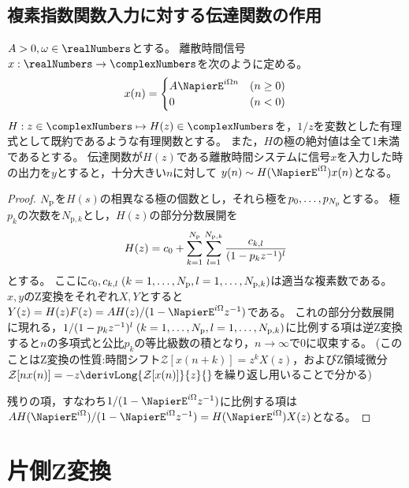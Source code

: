         \section{複素指数関数入力に対する伝達関数の作用}
            \begin{shadebox}
                $A>0,\omega \in \realNumbers$とする。
                離散時間信号$x: \realNumbers \to \complexNumbers$を次のように定める。
                \[
                    x(n) =
                    \begin{cases}
                        A\NapierE^{i\Omega n} & (n\geq 0) \\
                        0 & (n<0)
                    \end{cases}
                \]
                $H: z\in\complexNumbers \mapsto H(z) \in \complexNumbers$を，$1/z$を変数とした有理式として既約であるような有理関数とする。
                また，$H$の極の絶対値は全て1未満であるとする。
                伝達関数が$H(z)$である離散時間システムに信号$x$を入力した時の出力を$y$とすると，十分大きい$n$に対して
                $y(n) \sim H(\NapierE^{i\Omega})x(n)$となる。
            \end{shadebox}
            \begin{proof}
                ${N_\mathrm{p}}$を$H(s)$の相異なる極の個数とし，それら極を$p_0,\dots,p_{{N_\mathrm{p}}}$とする。
                極$p_k$の次数を$N_{\mathrm{p},k}$とし，$H(z)$の部分分数展開を
                \[ H(z) = c_0 + \sum_{k=1}^{{N_\mathrm{p}}} \sum_{l=1}^{N_{\mathrm{p},k}} \frac{c_{k,l}}{(1-p_kz^{-1})^l} \]
                とする。
                ここに$c_0,c_{k,l}\;(k=1,\dots,{N_\mathrm{p}},l=1,\dots,N_{\mathrm{p},k})$は適当な複素数である。
                $x,y$のZ変換をそれぞれ$X,Y$とすると$Y(z) = H(z)F(z) = A H(z)/(1-\NapierE^{i\Omega}z^{-1})$である。
                これの部分分数展開に現れる，$1/(1-p_k z^{-1})^l\;(k=1,\dots,{N_\mathrm{p}},l=1,\dots,N_{\mathrm{p},k})$に比例する項は逆Z変換すると$n$の多項式と公比$p_k$の等比級数の積となり，$n\to\infty$で0に収束する。
                (このことはZ変換の性質:時間シフト$\mathcal{Z}[x(n+k)] = z^kX(z)$，およびZ領域微分$\mathcal{Z}[nx(n)] = -z\derivLong{\mathcal{Z}[x(n)]}{z}{}$を繰り返し用いることで分かる)
                \par
                残りの項，すなわち$1/(1-\NapierE^{i\Omega}z^{-1})$に比例する項は$AH(\NapierE^{i\Omega})/(1-\NapierE^{i\Omega}z^{-1}) = H(\NapierE^{i\Omega})X(z)$となる。
            \end{proof}
    \chapter{片側Z変換}

